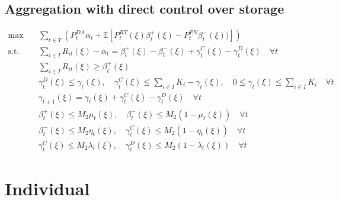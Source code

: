 \documentclass[10pt]{article}
\begin{document}
\subsection{Aggregation with direct control over storage}
\begin{subequations}
    \begin{align}
    \text{max} \quad &\sum_{t\in T}\left(P_t^{DA}\alpha_t + \mathbb{E}\left[P_t^{RT}(\xi)\beta_{t}^{+}(\xi) - P_t^{PN}\beta_{t}^{-}(\xi))\right]\right)&\\   
    \text{s.t.} \quad & \sum_{i \in I} R_{it}(\xi) - \alpha_t = \beta^+_t(\xi) - \beta^-_t(\xi) + \gamma^C_t(\xi) - \gamma^D_t(\xi) \quad \forall t &\\
    &\sum_{i\in I}R_{it}(\xi) \geq \beta_{t}^{+}(\xi) &\\
    & \gamma^D_t(\xi) \le \gamma_{t}(\xi), \quad \gamma^C_t(\xi) \le \sum_{i \in I}K_i - \gamma_{t}(\xi), \quad 0 \leq \gamma_t(\xi) \leq \sum_{i \in I} K_i \quad \forall t &\\
    &\gamma_{t+1}(\xi) = \gamma_{t}(\xi) + \gamma^C_t(\xi) - \gamma^D_t(\xi) \quad \forall t &\\
    &\beta^+_t(\xi) \le M_2 \mu_t(\xi), \quad \beta^-_t(\xi) \le M_2 (1 - \mu_t(\xi)) \quad \forall t &\\ 
    &\beta^-_t(\xi) \le M_2 \eta_t(\xi), \quad \gamma^C_t(\xi) \le M_2 (1 - \eta_t(\xi)) \quad \forall t &\\
    &\gamma^C_t(\xi) \le M_2\lambda_t(\xi), \quad \gamma^D_t(\xi) \le M_2(1 - \lambda_t(\xi)) \quad \forall t &
    \end{align}
\end{subequations}

\newpage
\section{Individual}
\end{document}
